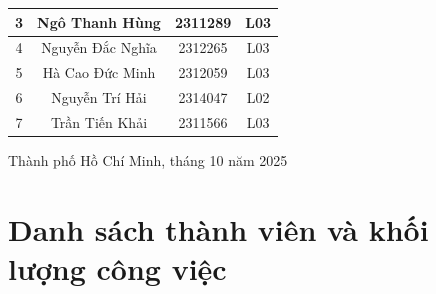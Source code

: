 \documentclass[a4paper, 15pt]{article}
\begin{document}
\begin{titlepage}
\begin{center}
\begin{tabular}{|c|c|c|c|}
\hline
{3} & {Ngô Thanh Hùng} & {2311289 } & {L03} \\

\hline
{4} & {Nguyễn Đắc Nghĩa} & {2312265 } & {L03} \\

\hline
{5} & {Hà Cao Đức Minh} & {2312059} & {L03} \\

\hline
{6} & {Nguyễn Trí Hải} & {2314047} & {L02} \\

\hline
{7} & {Trần Tiến Khải} & {2311566 
} & {L03} \\

\hline


\end{tabular}

\vfill
Thành phố Hồ Chí Minh, tháng 10 năm 2025

\end{center}
\end{titlepage}

\newpage
\tableofcontents
\newpage

\section*{Danh sách thành viên và khối lượng công việc}



\end{document}
